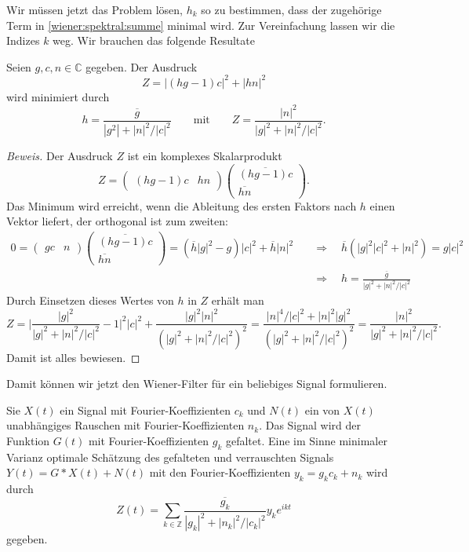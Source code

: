 Wir müssen jetzt das Problem lösen, $h_k$ so zu bestimmen, dass
der zugehörige Term in \eqref{wiener:spektral:summe} minimal wird.
Zur Vereinfachung lassen wir die Indizes $k$ weg.
Wir brauchen das folgende Resultate

\begin{hilfssatz}
Seien $g,c,n\in\mathbb C$ gegeben.
Der Ausdruck
\[
Z = |(hg-1)c|^2 + |hn|^2
\]
wird minimiert durch 
\[
h = \frac{\overline{g}}{|g^2|+|n|^2/|c|^2}
\qquad\text{mit}\qquad
Z = \frac{|n|^2}{|g|^2 + |n|^2/|c|^2}.
\]
\end{hilfssatz}

\begin{proof}[Beweis]
Der Ausdruck $Z$ ist ein komplexes Skalarprodukt
\[
Z
=
\begin{pmatrix}
(hg-1)c&hn
\end{pmatrix}
\begin{pmatrix}
\overline{(hg-1)c}\\\overline{hn}
\end{pmatrix}.
\]
Das Minimum wird erreicht, wenn die Ableitung des ersten Faktors nach
$h$ einen Vektor liefert, der orthogonal ist zum zweiten:
\begin{align*}
0
=
\begin{pmatrix}
gc&n
\end{pmatrix}
\begin{pmatrix}
\overline{(hg-1)c}\\\overline{hn}
\end{pmatrix}
=
(\overline{h} |g|^2 - g )|c|^2
+
\overline{h} |n|^2
\quad&\Rightarrow\quad
\overline{h}(|g|^2|c|^2+|n|^2)=g|c|^2
\\
\quad&\Rightarrow\quad
h=\frac{\overline{g}}{|g|^2 + |n|^2/|c|^2}
\end{align*}
Durch Einsetzen dieses Wertes von $h$ in $Z$ erhält man
\[
Z
=
\biggl|
\frac{|g|^2}{|g|^2+|n|^2/|c|^2}
-1
\biggr|^2 |c|^2
+
\frac{|g|^2|n|^2}{(|g|^2+|n|^2/|c|^2)^2}
=
\frac{|n|^4/|c|^2 + |n|^2 |g|^2}{(|g|^2+|n|^2/|c|^2)^2}
=
\frac{|n|^2}{|g|^2+|n|^2/ |c|^2}.
\]
Damit ist alles bewiesen.
\end{proof}

Damit können wir jetzt den Wiener-Filter für ein beliebiges Signal
formulieren.

\begin{satz}
\label{filter:wiener:satz}
Sie $X(t)$ ein Signal mit Fourier-Koeffizienten $c_k$ und $N(t)$
ein von $X(t)$ unabhängiges Rauschen mit Fourier-Koeffizienten $n_k$.
Das Signal wird der Funktion $G(t)$ mit Fourier-Koeffizienten
$g_k$ gefaltet.
Eine im Sinne minimaler Varianz optimale Schätzung des gefalteten und
verrauschten Signals $Y(t) = G*X(t) + N(t)$ mit den Fourier-Koeffizienten
$y_k = g_kc_k+n_k$ wird durch 
\[
Z(t)
=
\sum_{k\in\mathbb Z}
\frac{\overline{g_k}}{|g_k|^2+|n_k|^2/|c_k|^2} y_k e^{ikt}
\]
gegeben.
\end{satz}

